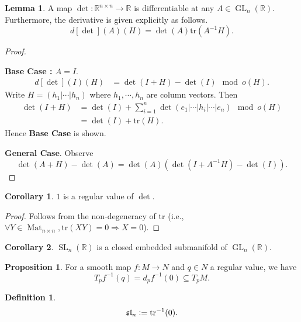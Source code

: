 \documentclass[10pt]{article}
\numberwithin{equation}{section}
\theoremstyle{definition}
\newtheorem{proposition}{Proposition}[section]
\newtheorem{definition}{Definition}[section]
\newtheorem{lemma}{Lemma}[section]
\newtheorem{corollary}{Corollary} [section]
\DeclareMathOperator{\GL}{GL}
\DeclareMathOperator{\SL}{SL}
\DeclareMathOperator{\Mat}{Mat}
\newcommand{\defeq}{\vcentcolon=}
\newcommand{\R}[0]{\mathbb{R}}
\newcommand{\tr}[0]{\mathrm{tr}}
\begin{document}
\begin{lemma}
    A map $\det:\R^{n\times n}\to \R$ is differentiable at any $A\in\GL_n(\R)$. Furthermore, the derivative is given explicitly as follows.
    \begin{equation*}
        d[\det](A)(H) = \det(A)\tr(A^{-1}H).
    \end{equation*}
\end{lemma}

\begin{proof}$\:$
    \par\textbf{Base Case : $A=I$}. 
    \begin{align*}
        d[\det](I)(H) &= \det(I+H)-\det(I)\mod{o(H)}.
    \end{align*}
    Write $H = (h_1|\cdots|h_n)$ where $h_1,\cdots,h_n$ are column vectors. Then 
    \begin{align*}
        \det(I+H) &= \det(I)+\sum_{i=1}^n\det(e_1|\cdots|h_i|\cdots|e_n)\mod{o(H)}\\
        & = \det(I) +\tr(H).
    \end{align*}
    Hence \textbf{Base Case} is shown.
    \par\textbf{General Case}. Observe 
    \begin{equation}
        \det(A+H)-\det(A) = \det(A)(\det(I+A^{-1}H)-\det(I)).
    \end{equation}
\end{proof}

\begin{corollary}
    $1$ is a regular value of $\det$.
\end{corollary}
\begin{proof}
    Follows from the non-degeneracy of $\tr$ (i.e., $\forall Y\in\Mat_{n\times n},\tr(XY) = 0\Rightarrow X=0$).
\end{proof}

\begin{corollary}
    $\SL_n(\R)$ is a closed embedded submanifold of $\GL_n(\R)$.
\end{corollary}

\begin{proposition}
    For a smooth map $f:M\to N$ and $q\in N$ a regular value, we have 
    \begin{equation*}
        T_pf^{-1}(q) = d_pf^{-1}(0)\subseteq T_pM.
    \end{equation*}
\end{proposition}

\begin{definition}
    \begin{equation*}
        \mathfrak{sl}_n \defeq \tr^{-1}(0).
    \end{equation*}
\end{definition}
\end{document}

